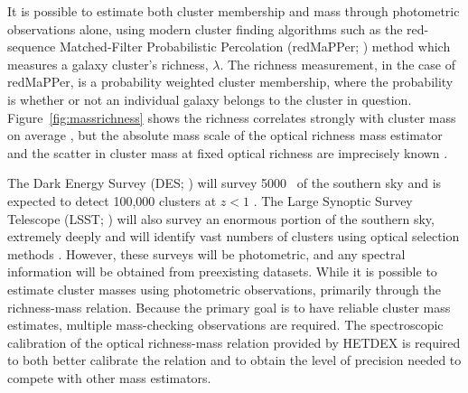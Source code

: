 It is possible to estimate both cluster membership and mass through photometric observations alone, using modern cluster finding algorithms such as the red-sequence Matched-Filter Probabilistic Percolation (redMaPPer; \citealt{Rykoff2014}) method which measures a galaxy cluster's richness, $\lambda$. The richness measurement, in the case of redMaPPer, is a probability weighted cluster membership, where the probability is whether or not an individual galaxy belongs to the cluster in question. Figure~\ref{fig:massrichness} shows the richness correlates strongly with cluster mass on average , but the absolute mass scale of the optical richness mass estimator and the scatter in cluster mass at fixed optical richness are imprecisely known \citep{Rykoff2012}.

The Dark Energy Survey (DES; \citealt{DES2005}) will survey 5000 \degsq\ of the southern sky and is expected to detect 100,000 clusters at $z<1$ \citep{DarkEnergySurveyCollaboration2016}. The Large Synoptic Survey Telescope (LSST; \citealt{LSST2012}) will also survey an enormous portion of the southern sky, extremely deeply and will identify vast numbers of clusters using optical selection methods . However, these surveys will be photometric, and any spectral information will be obtained from preexisting datasets. While it is possible to estimate cluster masses using photometric observations, primarily through the richness-mass relation. Because the primary goal is to have reliable cluster mass estimates, multiple mass-checking observations are required. The spectroscopic calibration of the optical richness-mass relation provided by HETDEX is required to both better calibrate the relation and to obtain the level of precision needed to compete with other mass estimators.

